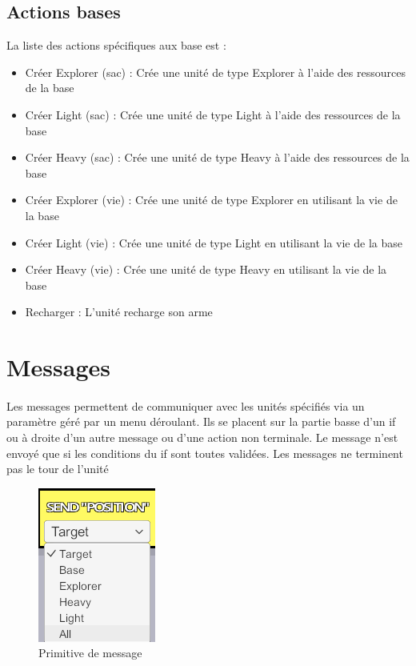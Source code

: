 \documentclass{report}
\begin{document}
\subsection{Actions bases}
La liste des actions spécifiques aux base est :
\begin{itemize}
\item Créer Explorer (sac) : Crée une unité de type Explorer à l'aide des ressources de la base
\item Créer Light (sac) : Crée une unité de type Light à l'aide des ressources de la base
\item Créer Heavy (sac) : Crée une unité de type Heavy à l'aide des ressources de la base
\item Créer Explorer (vie) : Crée une unité de type Explorer en utilisant la vie de la base
\item Créer Light (vie) : Crée une unité de type Light en utilisant la vie de la base
\item Créer Heavy (vie) : Crée une unité de type Heavy en utilisant la vie de la base
\item Recharger : L'unité recharge son arme
\end{itemize}
\newpage
\section{Messages}
\paragraph{}
Les messages permettent de communiquer avec les unités spécifiés via un paramètre géré par un menu déroulant. Ils se placent sur la partie basse d'un if ou à droite d'un autre message ou d'une action non terminale. Le message n'est envoyé que si les conditions du if sont toutes validées. Les messages ne terminent pas le tour de l'unité\newline
\begin{figure}[!h]
	\centering
		\includegraphics[scale=1]{msg.png}
	\caption{Primitive de message}
\end{figure}
\end{document}
